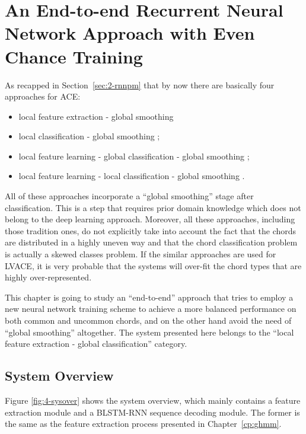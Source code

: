 
\chapter{An End-to-end Recurrent Neural Network Approach with Even Chance Training}\label{cp:endtoend} %


As recapped in Section~\ref{sec:2-rnnpm} that by now there are basically four approaches for ACE:
\begin{itemize}
\item local feature extraction - global smoothing \cite{fujishima1999realtime,sheh2003chord}
\item local classification - global smoothing \cite{humphrey2012rethinking};
\item local feature learning - global classification - global smoothing \cite{boulanger2013audio,sigtia2015audio};
\item local feature learning - local classification - global smoothing \cite{zhou2015chord}.
\end{itemize}
All of these approaches incorporate a ``global smoothing'' stage after classification. This is a step that requires prior domain knowledge which does not belong to the deep learning approach. Moreover, all these approaches, including those tradition ones, do not explicitly take into account the fact that the chords are distributed in a highly uneven way and that the chord classification problem is actually a skewed classes problem. If the similar approaches are used for LVACE, it is very probable that the systems will over-fit the chord types that are highly over-represented.

This chapter is going to study an ``end-to-end'' approach that tries to employ a new neural network training scheme to achieve a more balanced performance on both common and uncommon chords, and on the other hand avoid the need of ``global smoothing'' altogether. The system presented here belongs to the ``local feature extraction - global classification'' category.


\section{System Overview}\label{sec:4-sysover}
Figure \ref{fig:4-sysover} shows the system overview, which mainly contains a feature extraction module and a BLSTM-RNN sequence decoding module. The former is the same as the feature extraction process presented in Chapter~\ref{cp:ghmm}.

